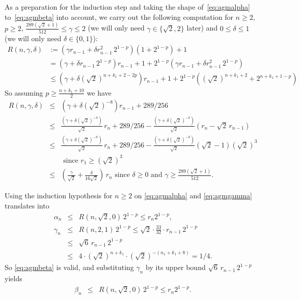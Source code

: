 \documentclass [11pt]{article}
\renewcommand {\leq}{\leqslant}
\renewcommand {\geq}{\geqslant}
\begin{document}
As a preparation for the induction step and taking the shape
of~\eqref {eq:agmalpha} to~\eqref {eq:agmbeta} into account, we carry out
the following computation for $n \geq 2$, $p \geq 2$,
$\frac {289 (\sqrt 2 + 1)}{512} \leq \gamma \leq 2$
(we will only need $\gamma \in \{ \sqrt 2, 2 \}$ later) and
$0 \leq \delta \leq 1$ (we will only need $\delta \in \{ 0, 1 \}$):
\[
\begin {aligned}
R (n, \gamma, \delta) &:=
  \left( \gamma r_{n-1} + \delta r_{n-1}^2 \, 2^{1-p} \right)
   \left( 1 + 2^{1-p} \right) + 1 \\
& = \left( \gamma + \delta r_{n-1} \, 2^{1-p} \right) r_{n-1} + 1
   + 2^{1-p} \left( \gamma r_{n-1} + \delta r_{n-1}^2 \, 2^{1-p} \right) \\
& \leq \left( \gamma + \delta (\sqrt 2)^{n + k_1 + 2 - 2 p} \right) r_{n-1}
   + 1 +
   2^{1-p} \left( (\sqrt 2)^{n + k_1 + 2} + 2^{n + k_1 + 1 - p} \right)
\end {aligned}
\]
So assuming $p \geq \frac {n + k_1 + 10}{2}$ we have
\begin {eqnarray*}
R (n, \gamma, \delta)
& \leq & \left( \gamma + \delta (\sqrt 2)^{-8} \right) r_{n-1}
   + 289/256 \\
& \leq & \frac {\left( \gamma + \delta (\sqrt 2)^{-8} \right)}{\sqrt 2}
   \, r_n + 289/256
   - \frac {\left( \gamma + \delta (\sqrt 2)^{-8} \right)}{\sqrt 2}
   \left( r_n - \sqrt 2 \, r_{n-1} \right) \\
& \leq & \frac {\left( \gamma + \delta (\sqrt 2)^{-8} \right)}{\sqrt 2}
   \, r_n + 289/256
   - \frac {\left( \gamma + \delta (\sqrt 2)^{-8} \right)}{\sqrt 2}
   \left( \sqrt 2 - 1 \right) (\sqrt 2)^3 \\
&&   \text { since } r_1 \geq (\sqrt 2)^3 \\
& \leq & \left( \frac {\gamma}{\sqrt 2} + \frac {\delta}{16 \sqrt 2} \right)
   \, r_n
   \text { since } \delta \geq 0
   \text { and } \gamma \geq \frac {289 (\sqrt 2 + 1)}{512}.
\end {eqnarray*}

\noindent
Using the induction hypothesis for $n \geq 2$ on \eqref {eq:agmalpha}
and \eqref {eq:agmgamma}
translates into
\begin {eqnarray*}
\alpha_n
& \leq & R (n, \sqrt 2, 0) \, 2^{1-p} \leq r_n 2^{1-p}, \\
\gamma_n
& \leq & R (n, 2, 1) \, 2^{1-p}
\leq \sqrt 2 \cdot \frac {33}{32} \cdot r_{n-1} \, 2^{1-p} \\
& \leq &
\sqrt 6 \, r_{n-1} \, 2^{1-p} \\
& \leq &
4 \cdot (\sqrt 2)^{n + k_1} \cdot (\sqrt 2)^{- (n_1 + k_1 + 8)}
= 1/4.
\end {eqnarray*}
So \eqref {eq:agmbeta} is valid, and substituting $\gamma_n$ by its
upper bound $\sqrt 6 \, r_{n-1} \, 2^{1-p}$ yields
\begin {eqnarray*}
\beta_n
& \leq & R (n, \sqrt 2, 0) \, 2^{1-p}
\leq r_n 2^{1-p}.
\end {eqnarray*}
\end{document}
